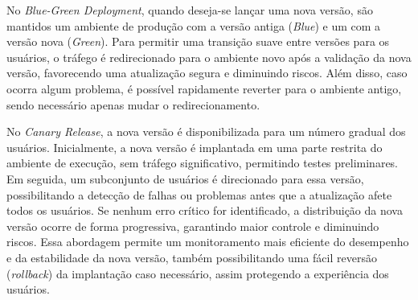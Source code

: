 




No \emph{Blue-Green Deployment}, quando deseja-se lançar uma nova versão, são mantidos um ambiente de produção com a versão antiga (\emph{Blue}) e um com a versão nova (\emph{Green}). Para permitir uma transição suave entre versões para os usuários, o tráfego é redirecionado para o ambiente novo após a validação da nova versão, favorecendo uma atualização segura e diminuindo riscos. Além disso, caso ocorra algum problema, é possível rapidamente reverter para o ambiente antigo, sendo necessário apenas mudar o redirecionamento.
\cite{martin-fowler-bluegreen}

No \emph{Canary Release}, a nova versão é disponibilizada para um número gradual dos usuários. Inicialmente, a nova versão é implantada em uma parte restrita do ambiente de execução, sem tráfego significativo, permitindo testes preliminares. Em seguida, um subconjunto de usuários é direcionado para essa versão, possibilitando a detecção de falhas ou problemas antes que a atualização afete todos os usuários. Se nenhum erro crítico for identificado, a distribuição da nova versão ocorre de forma progressiva, garantindo maior controle e diminuindo riscos. Essa abordagem permite um monitoramento mais eficiente do desempenho e da estabilidade da nova versão, também possibilitando uma fácil reversão (\emph{rollback}) da implantação caso necessário, assim protegendo a experiência dos usuários.
\cite{canary-release}

